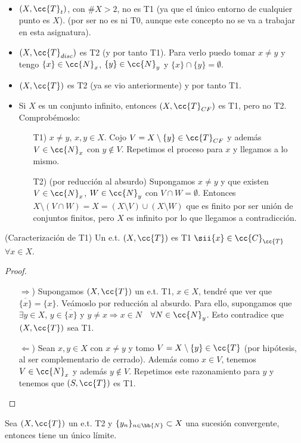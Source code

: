 \begin{ejemplo}\
    \begin{itemize}
        \item $(X, \cc{T}_t)$, con $\#X>2$, no es T1 (ya que el único entorno de cualquier punto es $X$). (por ser no es ni T0, aunque este concepto no se va a trabajar en esta asignatura).
        \item $(X, \cc{T}_{disc})$ es T2 (y por tanto T1). Para verlo puedo tomar $x\neq y$ y tengo $\{x\}\in \cc{N}_x$, $\{y\}\in \cc{N}_y$ y $\{x\}\cap \{y\}= \emptyset$.
        \item $(X, \cc{T})$ es T2 (ya se vio anteriormente) y por tanto T1.
        \item Si $X$ es un conjunto infinito, entonces $(X, \cc{T}_{CF})$ es T1, pero no T2. Comprobémoslo:
        \begin{enumerate}
            \item[T1)] $x\neq y$, $x,y\in X$. Cojo $V=X \setminus \{y\}\in \cc{T}_{CF}$ y además $V\in \cc{N}_x$ con $y\notin V$. Repetimos el proceso para $x$ y llegamos a lo mismo.
            \item[T2)] (por reducción al absurdo) Supongamos $x\neq y$ y que existen $V\in \cc{N}_x$, $W\in \cc{N}_y$ con $V\cap W=\emptyset$. Entonces $X\setminus(V\cap W) = X=(X\setminus V)\cup (X\setminus W)$ que es finito por ser unión de conjuntos finitos, pero $X$ es infinito por lo que llegamos a contradicción. 
        \end{enumerate}
    \end{itemize}
    \endsquare
\end{ejemplo}

\begin{prop}(Caracterización de T1)
    Un e.t. $(X, \cc{T})$ es T1 $\sii \{x\}\in \cc{C}_{\cc{T}}$\ \ $\forall x \in X$.

    \begin{proof}\
        \begin{itemize}
            \item[$\Rightarrow$)] Supongamos $(X, \cc{T})$ un e.t. T1, $x \in X$, tendré que ver que $\overline{\{x\}} = \{x\}$. Veámoslo por reducción al absurdo. Para ello, supongamos que $\exists y \in X$, $y\in \overline{\{x\}}$ y $y \neq x \Rightarrow x \in N$\ \ $\forall N \in \cc{N}_y$. Esto contradice que $(X, \cc{T})$ sea T1.
            \item[$\Leftarrow$)] Sean $x,y\in X$ con $x\neq y$ y tomo $V=X\setminus\{y\}\in \cc{T}$ (por hipótesis, al ser complementario de cerrado). Además como $x \in V$, tenemos $V\in \cc{N}_x$ y además $y\notin V$. Repetimos este razonamiento para $y$ y tenemos que $(S, \cc{T})$ es T1. 
        \end{itemize}
    \end{proof}
\end{prop}

\begin{ejercicio}
    Sea $(X, \cc{T})$ un e.t. T2 y $\{y_n\}_{n\in \bb{N}}\subset X$ una sucesión convergente, entonces tiene un único límite.
\end{ejercicio}